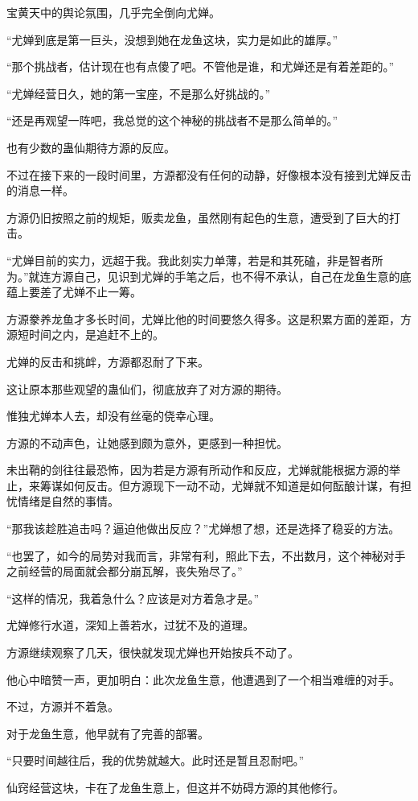 \begin{this_body}
宝黄天中的舆论氛围，几乎完全倒向尤婵。

“尤婵到底是第一巨头，没想到她在龙鱼这块，实力是如此的雄厚。”

“那个挑战者，估计现在也有点傻了吧。不管他是谁，和尤婵还是有着差距的。”

“尤婵经营日久，她的第一宝座，不是那么好挑战的。”

“还是再观望一阵吧，我总觉的这个神秘的挑战者不是那么简单的。”

也有少数的蛊仙期待方源的反应。

不过在接下来的一段时间里，方源都没有任何的动静，好像根本没有接到尤婵反击的消息一样。

方源仍旧按照之前的规矩，贩卖龙鱼，虽然刚有起色的生意，遭受到了巨大的打击。

“尤婵目前的实力，远超于我。我此刻实力单薄，若是和其死磕，非是智者所为。”就连方源自己，见识到尤婵的手笔之后，也不得不承认，自己在龙鱼生意的底蕴上要差了尤婵不止一筹。

方源豢养龙鱼才多长时间，尤婵比他的时间要悠久得多。这是积累方面的差距，方源短时间之内，是追赶不上的。

尤婵的反击和挑衅，方源都忍耐了下来。

这让原本那些观望的蛊仙们，彻底放弃了对方源的期待。

惟独尤婵本人去，却没有丝毫的侥幸心理。

方源的不动声色，让她感到颇为意外，更感到一种担忧。

未出鞘的剑往往最恐怖，因为若是方源有所动作和反应，尤婵就能根据方源的举止，来筹谋如何反击。但方源现下一动不动，尤婵就不知道是如何酝酿计谋，有担忧情绪是自然的事情。

“那我该趁胜追击吗？逼迫他做出反应？”尤婵想了想，还是选择了稳妥的方法。

“也罢了，如今的局势对我而言，非常有利，照此下去，不出数月，这个神秘对手之前经营的局面就会都分崩瓦解，丧失殆尽了。”

“这样的情况，我着急什么？应该是对方着急才是。”

尤婵修行水道，深知上善若水，过犹不及的道理。

方源继续观察了几天，很快就发现尤婵也开始按兵不动了。

他心中暗赞一声，更加明白：此次龙鱼生意，他遭遇到了一个相当难缠的对手。

不过，方源并不着急。

对于龙鱼生意，他早就有了完善的部署。

“只要时间越往后，我的优势就越大。此时还是暂且忍耐吧。”

仙窍经营这块，卡在了龙鱼生意上，但这并不妨碍方源的其他修行。


\end{this_body}
